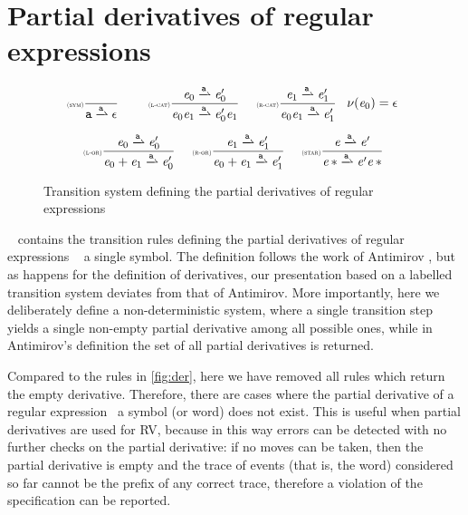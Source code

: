 \section{Partial derivatives of regular expressions}\label{sec:parDer}

\begin{figure}
 $$
  \begin{array}{c}
   \Rule{sym}{}{\sym\parDer{\sym}\eps}\quad
   \Rule{l-cat}{\re_0\parDer{\sym}\re'_0}{\re_0\catop\re_1\parDer{\sym}\re'_0\catop\re_1}{}\quad
   \Rule{r-cat}{\re_1\parDer{\sym}\re'_1}{\re_0\catop\re_1\parDer{\sym}\re'_1}{\hasEps{\re_0}=\eps} \\[4ex]
   \Rule{l-or}{\re_0\parDer{\sym}\re'_0}{\re_0\orop\re_1\parDer{\sym}\re'_0}{} \quad
   \Rule{r-or}{\re_1\parDer{\sym}\re'_1}{\re_0\orop\re_1\parDer{\sym}\re'_1}{} \quad
   \Rule{star}{\re\parDer{\sym}\re'}{\starop{\re}\parDer{\sym}\re'\catop\starop{\re}}{}
  \end{array}
 $$
 \caption{Transition system defining the partial derivatives of regular expressions}
 \label{fig:parDer}
\end{figure}

~ contains the transition rules defining the partial derivatives of regular expressions \wrt~ a single symbol.
The definition follows the work of Antimirov \cite{Antimirov96}, but
as happens for the definition of derivatives, our presentation based on a labelled transition system deviates from that of Antimirov. More importantly, here we deliberately define a non-deterministic system, where a single transition step yields a single non-empty partial derivative among all possible ones, while in Antimirov's definition the set of all partial derivatives is returned.

Compared to the rules in \cref{fig:der}, here we have removed all rules which return the empty derivative. Therefore, there are cases where the partial derivative of a regular expression \wrt\ a symbol (or word) does not exist. This is useful when partial derivatives are used for RV, because in this way errors can be detected with no further checks on the partial derivative: if no moves can be taken, then the partial derivative is empty and  the trace of events (that is, the word) considered so far cannot be the prefix of any correct trace, therefore a violation of the specification can be reported.


